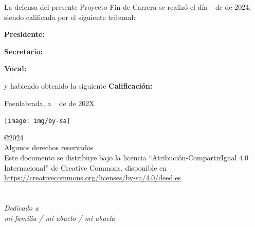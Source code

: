 \documentclass[a4paper, 12pt]{book}
\makeatletter
\let\theauthor\@author
\makeatother
\begin{document}
\vspace{0.8cm}
La defensa del presente Proyecto Fin de Carrera se realizó el día \qquad$\;\,$ de \qquad\qquad\qquad\qquad \newline de 2024, siendo calificada por el siguiente tribunal:


\vspace{0.5cm}
\textbf{Presidente:}

\vspace{1cm}
\textbf{Secretario:}

\vspace{1cm}
\textbf{Vocal:}


\vspace{1cm}
y habiendo obtenido la siguiente \textbf{Calificación:}


\vspace{1cm}
\begin{flushright}
Fuenlabrada, a \qquad$\;\,$ de \qquad\qquad\qquad\qquad de 202X
\end{flushright}

\vspace{1cm}

\texttt{[image: img/by-sa]}

\noindent©2024 \theauthor  \\
Algunos derechos reservados  \\
Este documento se distribuye bajo la licencia ``Atribución-CompartirIgual 4.0 Internacional'' de Creative Commons, disponible en \\
\url{https://creativecommons.org/licenses/by-sa/4.0/deed.es}



\chapter*{}
\begin{flushright}
\textit{Dedicado a \\
mi familia / mi abuelo / mi abuela}
\end{flushright}

\end{document}
